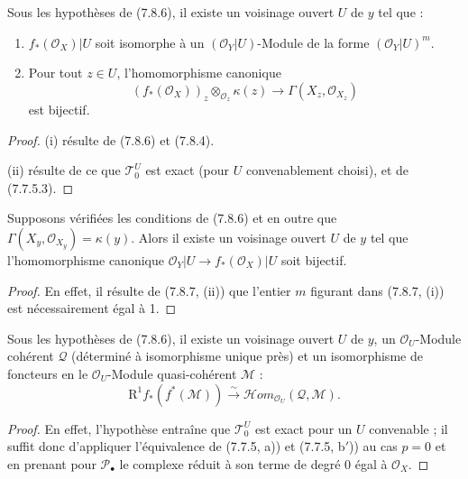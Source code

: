 \begin{corollary}[7.8.7]
Sous les hypothèses de (7.8.6), il existe un voisinage ouvert $U$ de $y$ tel
que :
\begin{enumerate}
  \item[(i)] $f_*(\mathscr O_X)|U$ soit isomorphe à un
    $(\mathscr O_Y|U)$-Module de la forme $(\mathscr O_Y|U)^m$.
  \item[(ii)] Pour tout $z\in U$, l'homomorphisme canonique
    \[
      (f_*(\mathscr O_X))_z
      \otimes_{\mathscr O_z}\kappa(z)
      \longrightarrow
      \Gamma(X_z,\mathscr O_{X_z})
    \]
    est bijectif.
\end{enumerate}
\end{corollary}

\begin{proof}
(i) résulte de (7.8.6) et (7.8.4).

(ii) résulte de ce que $\mathscr T_0^U$ est exact (pour $U$ convenablement
choisi), et de (7.7.5.3).
\end{proof}

\begin{corollary}[7.8.8]
Supposons vérifiées les conditions de (7.8.6) et en outre que
$\Gamma(X_y,\mathscr O_{X_y})=\kappa(y)$. Alors il existe un voisinage ouvert
$U$ de $y$ tel que l'homomorphisme canonique
$\mathscr O_Y|U\to f_*(\mathscr O_X)|U$ soit bijectif.
\end{corollary}

\begin{proof}
En effet, il résulte de (7.8.7, (ii)) que l'entier $m$ figurant dans (7.8.7,
(i)) est nécessairement égal à 1.
\end{proof}

\begin{corollary}[7.8.9]
Sous les hypothèses de (7.8.6), il existe un voisinage ouvert $U$ de $y$, un
$\mathscr O_U$-Module cohérent $\mathscr Q$ (déterminé à isomorphisme unique
près) et un isomorphisme de foncteurs en le $\mathscr O_U$-Module quasi-cohérent
$\mathscr M$ :
\[
  \mathrm R^1f_*(f^*(\mathscr M))
  \xrightarrow{\sim}
  \mathscr{H}\!om_{\mathscr O_U}(\mathscr Q,\mathscr M).
  \tag{7.8.9.1}\label{III.7.8.9.1.fr}
\]
\end{corollary}

\begin{proof}
En effet, l'hypothèse entraîne que $\mathscr T_0^U$ est exact pour un $U$
convenable ; il suffit donc d'appliquer l'équivalence de (7.7.5, a)) et
(7.7.5, b$'$)) au cas $p=0$ et en prenant pour $\mathscr P_\bullet$ le complexe
réduit à son terme de degré 0 égal à $\mathscr O_X$.
\end{proof}


